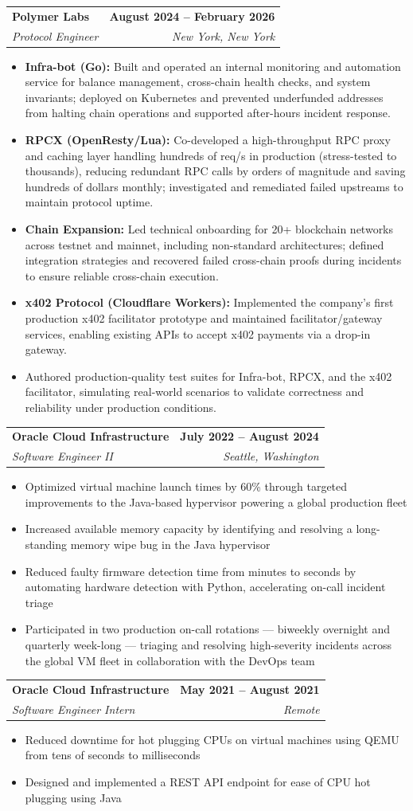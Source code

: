 \documentclass[letterpaper,11pt]{article}
\makeatletter
\newcommand{\resumeItem}[1]{
  \item\small{
    {#1 \vspace{-2pt}}
  }
}
\newcommand{\resumeSubheading}[4]{
  \vspace{-2pt}\item
    \begin{tabular*}{1.0\textwidth}[t]{l@{\extracolsep{\fill}}r}
      \textbf{#1} & \textbf{\small #2} \\
      \textit{\small#3} & \textit{\small #4} \\
    \end{tabular*}\vspace{-7pt}
}
\newcommand{\resumeItemListStart}{\begin{itemize}}
\newcommand{\resumeItemListEnd}{\end{itemize}\vspace{-5pt}}
\makeatother
\begin{document}
    \resumeSubheading
      {Polymer Labs}{August 2024 -- February 2026}
      {Protocol Engineer}{New York, New York}
      \resumeItemListStart
        \resumeItem{\textbf{Infra-bot (Go):} Built and operated an internal monitoring and automation service for balance management, cross-chain health checks, and system invariants; deployed on Kubernetes and prevented underfunded addresses from halting chain operations and supported after-hours incident response.}
        \resumeItem{\textbf{RPCX (OpenResty/Lua):} Co-developed a high-throughput RPC proxy and caching layer handling hundreds of req/s in production (stress-tested to thousands), reducing redundant RPC calls by orders of magnitude and saving hundreds of dollars monthly; investigated and remediated failed upstreams to maintain protocol uptime.}
        \resumeItem{\textbf{Chain Expansion:} Led technical onboarding for 20+ blockchain networks across testnet and mainnet, including non-standard architectures; defined integration strategies and recovered failed cross-chain proofs during incidents to ensure reliable cross-chain execution.}
        \resumeItem{\textbf{x402 Protocol (Cloudflare Workers):} Implemented the company's first production x402 facilitator prototype and maintained facilitator/gateway services, enabling existing APIs to accept x402 payments via a drop-in gateway.}
        \resumeItem{Authored production-quality test suites for Infra-bot, RPCX, and the x402 facilitator, simulating real-world scenarios to validate correctness and reliability under production conditions.}
      \resumeItemListEnd
    \resumeSubheading
      {Oracle Cloud Infrastructure}{July 2022 -- August 2024}
      {Software Engineer II}{Seattle, Washington}
      \resumeItemListStart
        \resumeItem{Optimized virtual machine launch times by 60\% through targeted improvements to the Java-based hypervisor powering a global production fleet}
        \resumeItem{Increased available memory capacity by identifying and resolving a long-standing memory wipe bug in the Java hypervisor}
        \resumeItem{Reduced faulty firmware detection time from minutes to seconds by automating hardware detection with Python, accelerating on-call incident triage}
        \resumeItem{Participated in two production on-call rotations — biweekly overnight and quarterly week-long — triaging and resolving high-severity incidents across the global VM fleet in collaboration with the DevOps team}
      \resumeItemListEnd

    \resumeSubheading
      {Oracle Cloud Infrastructure}{May 2021 -- August 2021}
      {Software Engineer Intern}{Remote}
      \resumeItemListStart
        \resumeItem{Reduced downtime for hot plugging CPUs on virtual machines using QEMU from tens of seconds to milliseconds}
        \resumeItem{Designed and implemented a REST API endpoint for ease of CPU hot plugging using Java}
    \resumeItemListEnd
\end{document}
